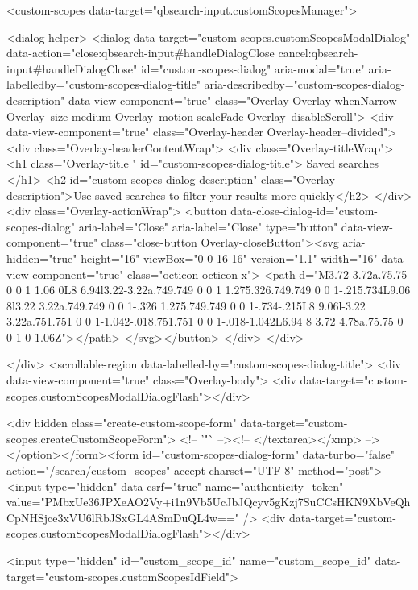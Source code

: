     <custom-scopes data-target="qbsearch-input.customScopesManager">
    
<dialog-helper>
  <dialog data-target="custom-scopes.customScopesModalDialog" data-action="close:qbsearch-input#handleDialogClose cancel:qbsearch-input#handleDialogClose" id="custom-scopes-dialog" aria-modal="true" aria-labelledby="custom-scopes-dialog-title" aria-describedby="custom-scopes-dialog-description" data-view-component="true" class="Overlay Overlay-whenNarrow Overlay--size-medium Overlay--motion-scaleFade Overlay--disableScroll">
    <div data-view-component="true" class="Overlay-header Overlay-header--divided">
  <div class="Overlay-headerContentWrap">
    <div class="Overlay-titleWrap">
      <h1 class="Overlay-title " id="custom-scopes-dialog-title">
        Saved searches
      </h1>
        <h2 id="custom-scopes-dialog-description" class="Overlay-description">Use saved searches to filter your results more quickly</h2>
    </div>
    <div class="Overlay-actionWrap">
      <button data-close-dialog-id="custom-scopes-dialog" aria-label="Close" aria-label="Close" type="button" data-view-component="true" class="close-button Overlay-closeButton"><svg aria-hidden="true" height="16" viewBox="0 0 16 16" version="1.1" width="16" data-view-component="true" class="octicon octicon-x">
    <path d="M3.72 3.72a.75.75 0 0 1 1.06 0L8 6.94l3.22-3.22a.749.749 0 0 1 1.275.326.749.749 0 0 1-.215.734L9.06 8l3.22 3.22a.749.749 0 0 1-.326 1.275.749.749 0 0 1-.734-.215L8 9.06l-3.22 3.22a.751.751 0 0 1-1.042-.018.751.751 0 0 1-.018-1.042L6.94 8 3.72 4.78a.75.75 0 0 1 0-1.06Z"></path>
</svg></button>
    </div>
  </div>
  
</div>
      <scrollable-region data-labelled-by="custom-scopes-dialog-title">
        <div data-view-component="true" class="Overlay-body">        <div data-target="custom-scopes.customScopesModalDialogFlash"></div>

        <div hidden class="create-custom-scope-form" data-target="custom-scopes.createCustomScopeForm">
        <!-- '"` --><!-- </textarea></xmp> --></option></form><form id="custom-scopes-dialog-form" data-turbo="false" action="/search/custom_scopes" accept-charset="UTF-8" method="post"><input type="hidden" data-csrf="true" name="authenticity_token" value="PMbxUe36JPXeAO2Vy+i1n9Vb5UcJbJQcyv5gKzj7SuCCsHKN9XbVeQhCpNHSjce3xVU6lRbJSxGL4ASmDuQL4w==" />
          <div data-target="custom-scopes.customScopesModalDialogFlash"></div>

          <input type="hidden" id="custom_scope_id" name="custom_scope_id" data-target="custom-scopes.customScopesIdField">

